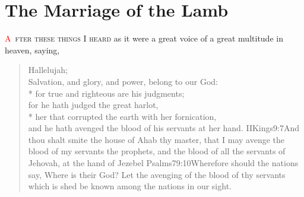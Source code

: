 
\chapter{The Marriage of the Lamb}
\fancyhead{} %
\lettrine[lines=3,slope=0.5em, lraise=0.3]{\textcolor{red}{A}}{\ fter these things I heard} as it were a great voice of a great multitude%
in heaven, saying,
\zz \begin{verse}
Hallelujah;\\
Salvation, and glory, and power, belong to our God:\\*\vin
{}for true and righteous are his judgments;\\
for he hath judged the great harlot,\\*\vin
her that corrupted the earth with her fornication,\\
and he hath avenged the blood of his servants at her hand.%
				{IIKings}{9:7}{And thou shalt smite the house of Ahab thy master, that I may avenge the blood of my servants the prophets, and the blood of all the servants of Jehovah, at the hand of Jezebel}%
				{Psalms}{79:10}{Wherefore should the nations say, Where is their God? Let the avenging of the blood of thy servants which is shed be known among the nations in our sight.} %
\end{verse}

